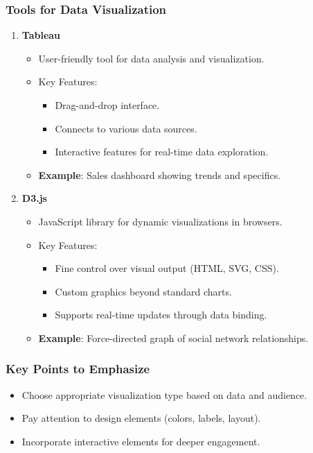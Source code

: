 \documentclass{beamer}
\begin{document}
\begin{frame}[fragile]
    \frametitle{Tools for Data Visualization}
    \begin{enumerate}
        \item \textbf{Tableau}
            \begin{itemize}
                \item User-friendly tool for data analysis and visualization.
                \item Key Features:
                    \begin{itemize}
                        \item Drag-and-drop interface.
                        \item Connects to various data sources.
                        \item Interactive features for real-time data exploration.
                    \end{itemize}
                \item \textbf{Example}: Sales dashboard showing trends and specifics.
            \end{itemize}
        
        \item \textbf{D3.js}
            \begin{itemize}
                \item JavaScript library for dynamic visualizations in browsers.
                \item Key Features:
                    \begin{itemize}
                        \item Fine control over visual output (HTML, SVG, CSS).
                        \item Custom graphics beyond standard charts.
                        \item Supports real-time updates through data binding.
                    \end{itemize}
                \item \textbf{Example}: Force-directed graph of social network relationships.
            \end{itemize}
    \end{enumerate}
\end{frame}

\begin{frame}[fragile]
    \frametitle{Key Points to Emphasize}
    \begin{itemize}
        \item Choose appropriate visualization type based on data and audience.
        \item Pay attention to design elements (colors, labels, layout).
        \item Incorporate interactive elements for deeper engagement.
    \end{itemize}
\end{frame}
\end{document}
